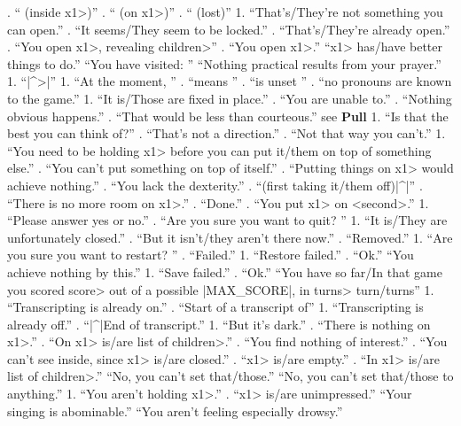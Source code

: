 . ``   (inside \<x1>)''
. ``   (on \<x1>)''
. ``   (lost)''
   1. ``That's/They're not something you can open.''
. ``It seems/They seem to be locked.''
. ``That's/They're already open.''
. ``You open \<x1>, revealing \<children>''
. ``You open \<x1>.''
  ``\<x1> has/have better things to do.''
  ``You have visited: '' 
   ``Nothing practical results from your prayer.''
 1. ``|^>|''
 1. ``At the moment, ''
. ``means ''
. ``is unset ''
. ``no pronouns are known to the game.''
  1. ``It is/Those are fixed in place.''
. ``You are unable to.''
. ``Nothing obvious happens.''
. ``That would be less than courteous.''
 see {\bf Pull}
 1. ``Is that the best you can think of?''
. ``That's not a direction.''
. ``Not that way you can't.''
  1. ``You need to be holding \<x1> before you
can put it/them on top of something else.''
. ``You can't put something on top of itself.''
. ``Putting things on \<x1> would achieve nothing.''
. ``You lack the dexterity.''
. ``(first taking it/them off)|^|''
. ``There is no more room on \<x1>.''
. ``Done.''
. ``You put \<x1> on <second>.''
   1. ``Please answer yes or no.''
. ``Are you sure you want to quit? '' 
  1. ``It is/They are unfortunately closed.''
. ``But it isn't/they aren't there now.''
. ``Removed.''
 1. ``Are you sure you want to restart? ''
. ``Failed.''
 1. ``Restore failed.''
. ``Ok.''
   ``You achieve nothing by this.''
   1. ``Save failed.''
. ``Ok.''
  ``You have so far/In that game you scored \<score> out of
a possible |MAX_SCORE|, in \<turns> turn/turns''
 1. ``Transcripting is already on.''
. ``Start of a transcript of''
 1. ``Transcripting is already off.''
. ``|^|End of transcript.''
  1. ``But it's dark.''
. ``There is nothing on \<x1>.''
. ``On \<x1> is/are \<list of children>.''
. ``You find nothing of interest.''
. ``You can't see inside, since \<x1> is/are closed.''
. ``\<x1> is/are empty.''
. ``In \<x1> is/are \<list of children>.''
   ``No, you can't set that/those.''
  ``No, you can't set that/those to anything.''
   1. ``You aren't holding \<x1>.''
. ``\<x1> is/are unimpressed.''
   ``Your singing is abominable.''
  ``You aren't feeling especially drowsy.''
